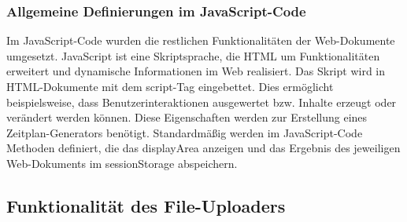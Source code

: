 {\subsubsection{Allgemeine Definierungen im JavaScript-Code}
Im JavaScript-Code wurden die restlichen Funktionalitäten der Web-Dokumente umgesetzt. JavaScript ist eine Skriptsprache, die HTML um Funktionalitäten erweitert und dynamische Informationen im Web realisiert. Das Skript wird in HTML-Dokumente mit dem script-Tag eingebettet. Dies ermöglicht beispielsweise, dass Benutzerinteraktionen ausgewertet bzw. Inhalte erzeugt oder verändert werden können. Diese Eigenschaften werden zur Erstellung eines Zeitplan-Generators benötigt. 
Standardmäßig werden im JavaScript-Code Methoden definiert, die das displayArea anzeigen und das Ergebnis des jeweiligen Web-Dokuments im sessionStorage abspeichern.


\subsection{Funktionalität des File-Uploaders}
  
}
